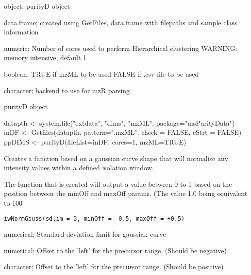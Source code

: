 \documentclass[letterpaper]{book}
\begin{document}
%
\begin{Arguments}
\begin{ldescription}
\item[\code{.Object}] object; purityD object

\item[\code{fileList}] data.frame; created using GetFiles, data.frame with filepaths and sample class information

\item[\code{cores}] numeric; Number of cores used to perform Hierarchical clustering WARNING: memory intensive, default 1

\item[\code{mzML}] boolean; TRUE if mzML to be used FALSE if .csv file to be used

\item[\code{mzRback}] character; backend to use for mzR parsing
\end{ldescription}
\end{Arguments}
%
\begin{Value}
purityD object
\end{Value}
%
\begin{Examples}
\begin{ExampleCode}
datapth <- system.file("extdata", "dims", "mzML", package="msPurityData")
inDF <- Getfiles(datapth, pattern=".mzML", check = FALSE, cStrt = FALSE)
ppDIMS <- purityD(fileList=inDF, cores=1, mzML=TRUE)
\end{ExampleCode}
\end{Examples}
%
\begin{Description}\relax
Creates a function based on a gaussian curve shape that will normalise any intensity values within
a defined isolation window.

The function that is created will output a value between 0 to 1 based on the position between
the minOff and maxOff params. (The value 1.0 being equivalent to 100
\end{Description}
%
\begin{Usage}
\begin{verbatim}
iwNormGauss(sdlim = 3, minOff = -0.5, maxOff = +0.5)
\end{verbatim}
\end{Usage}
%
\begin{Arguments}
\begin{ldescription}
\item[\code{sdlim}] numerical; Standard deviation limit for gaussian curve

\item[\code{minOff}] numerical; Offset to the 'left' for the precursor range. (Should be negative)

\item[\code{maxOff}] character; Offset to the 'left' for the precursor range. (Should be positive)
\end{ldescription}
\end{Arguments}
\end{document}
